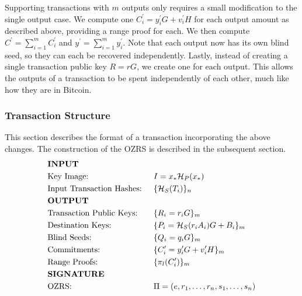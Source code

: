\documentclass{article}
\newcommand{\sidx}{\ensuremath{*}}
\newcommand{\sx}{\ensuremath{x_\sidx}}
\newcommand{\oy}{\ensuremath{y^\prime}}
\newcommand{\oiy}{\ensuremath{y^\prime_i}}
\newcommand{\oC}{\ensuremath{C^\prime}}
\newcommand{\oiC}{\ensuremath{C^\prime_i}}
\newcommand{\oiv}{\ensuremath{v^\prime_i}}
\newcommand{\hs}{\ensuremath{\mathcal{H}_S}}
\newcommand{\hp}{\ensuremath{\mathcal{H}_P}}
\begin{document}
Supporting transactions with $m$ outputs only requires a small modification to
the single output case.  We compute one $\oiC = \oiy G + \oiv H$ for each output
amount as described above, providing a range proof for each.  We then compute
$\oC = \sum_{i=1}^m \oiC$ and $\oy = \sum_{i=1}^m \oiy$.  Note that each output
now has its own blind seed, so they can each be recovered independently.
Lastly, instead of creating a single transaction public key $R=rG$, we create
one for each output.  This allows the outputs of a transaction to be spent
independently of each other, much like how they are in Bitcoin.

\subsubsection{Transaction Structure}

This section describes the format of a transaction incorporating the above
changes.  The construction of the OZRS is described in the subsequent section.
\begin{align*} 
  & \text{\bf{INPUT}}       &&                                           \\%
  & \text{Key Image: } && I = \sx \hp(\sx)                                \\%
  & \text{Input Transaction Hashes: } && \{ \hs(T_i) \}_n                 \\%
  & \text{\bf{OUTPUT}}     &&                                            \\%
  & \text{Transaction Public Keys: } && \{ R_i = r_i G \}_m               \\%
  & \text{Destination Keys: } && \{ P_i = \hs(r_i A_i)G + B_i \}_m        \\%
  & \text{Blind Seeds: } && \{ Q_i = q_i G \}_m                           \\%
  & \text{Commitments: } && \{ \oiC = \oiy G + \oiv H \}_m                \\%
  & \text{Range Proofs: } && \{ \pi_l(\oiC) \}_m                          \\%
  & \text{\bf{SIGNATURE}} &&                                              \\%
  & \text{OZRS: } && \Pi = (e, r_1, \dots, r_n, s_1, \dots, s_n)          \\%
\end{align*} 
\end{document}
